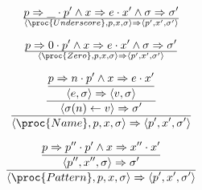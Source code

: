 \begin{equation}
{
    p\Rightarrow \_\cdot p'
  \wedge
    x\Rightarrow e\cdot x'
  \wedge
    \sigma\Rightarrow\sigma'
}\over{
  \left\langle\proc{Underscore}, p,x,\sigma\right\rangle
  \Rightarrow
  \left\langle p',x',\sigma'\right\rangle
}
\end{equation}

\begin{equation}
{
    p\Rightarrow 0\cdot p'
  \wedge
    x\Rightarrow e\cdot x'
  \wedge
    \sigma\Rightarrow\sigma'
}\over{
  \left\langle\proc{Zero}, p,x,\sigma\right\rangle
  \Rightarrow
  \left\langle p',x',\sigma'\right\rangle
}
\end{equation}


\begin{equation}
{\displaystyle
{\displaystyle
{\displaystyle
    p\Rightarrow n\cdot p'
  \wedge
    x\Rightarrow e\cdot x'
\over\displaystyle
    \left\langle e,\sigma\right\rangle
    \Rightarrow
    \left\langle v,\sigma\right\rangle
}\over\displaystyle
    \left\langle\sigma(n)\leftarrow v\right\rangle
    \Rightarrow
    \sigma'
}\over\displaystyle
  \left\langle\proc{Name}, p,x,\sigma\right\rangle
  \Rightarrow
  \left\langle p',x',\sigma'\right\rangle
}
\end{equation}

\begin{equation}
{\displaystyle
{\displaystyle
    p\Rightarrow p''\cdot p'  
  \wedge
    x\Rightarrow x''\cdot x'
\over\displaystyle
  \left\langle p'', x'', \sigma\right\rangle
  \Rightarrow
  \sigma'
}
\over\displaystyle
  \left\langle\proc{Pattern}, p,x,\sigma\right\rangle
  \Rightarrow
  \left\langle p',x',\sigma'\right\rangle
}
\end{equation}
